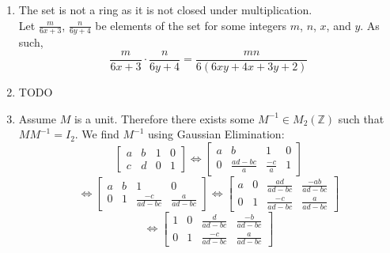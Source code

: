 \documentclass{article}
\begin{document}
\begin{enumerate}
\item The set is not a ring as it is not closed under multiplication.\\
Let $\frac{m}{6x+3}$, $\frac{n}{6y+4}$ be elements of the set for some integers
$m$, $n$, $x$, and $y$.  As such,
\[
\frac{m}{6x+3}\cdot\frac{n}{6y+4} = \frac{mn}{6(6xy+4x+3y+2)}
\]

\item TODO

\item Assume $M$ is a unit.  Therefore there exists some $M^{-1} \in M_2(\mathbb{Z})$
such that $MM^{-1} = I_2$.  We find $M^{-1}$ using Gaussian Elimination:
\[
\left[
\begin{array}{cc|cc}
a & b & 1 & 0 \\
c & d & 0 & 1
\end{array}
\right]
\Leftrightarrow
\left[
\begin{array}{cc|cc}
a & b & 1 & 0 \\
0 & \frac{ad-bc}{a} & \frac{-c}{a} & 1
\end{array}
\right]
\]
\[
\Leftrightarrow
\left[
\begin{array}{cc|cc}
a & b & 1 & 0 \\
0 & 1 & \frac{-c}{ad-bc} & \frac{a}{ad-bc}
\end{array}
\right]
\Leftrightarrow
\left[
\begin{array}{cc|cc}
a & 0 & \frac{ad}{ad-bc} & \frac{-ab}{ad-bc} \\
0 & 1 & \frac{-c}{ad-bc} & \frac{a}{ad-bc}
\end{array}
\right]
\]
\[
\Leftrightarrow
\left[
\begin{array}{cc|cc}
1 & 0 & \frac{d}{ad-bc} & \frac{-b}{ad-bc} \\
0 & 1 & \frac{-c}{ad-bc} & \frac{a}{ad-bc}
\end{array}
\right]
\]


\end{enumerate}
\end{document}
